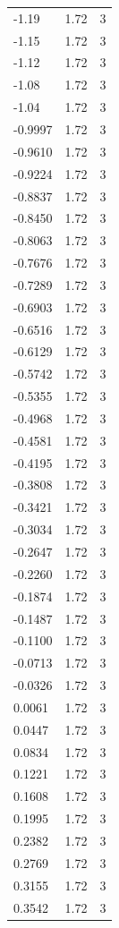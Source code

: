 \begin{longtable}{lrr}
  -1.19 & 1.72 & 3 \\
  -1.15 & 1.72 & 3 \\
  -1.12 & 1.72 & 3 \\
  -1.08 & 1.72 & 3 \\
  -1.04 & 1.72 & 3 \\
  -0.9997 & 1.72 & 3 \\
  -0.9610 & 1.72 & 3 \\
  -0.9224 & 1.72 & 3 \\
  -0.8837 & 1.72 & 3 \\
  -0.8450 & 1.72 & 3 \\
  -0.8063 & 1.72 & 3 \\
  -0.7676 & 1.72 & 3 \\
  -0.7289 & 1.72 & 3 \\
  -0.6903 & 1.72 & 3 \\
  -0.6516 & 1.72 & 3 \\
  -0.6129 & 1.72 & 3 \\
  -0.5742 & 1.72 & 3 \\
  -0.5355 & 1.72 & 3 \\
  -0.4968 & 1.72 & 3 \\
  -0.4581 & 1.72 & 3 \\
  -0.4195 & 1.72 & 3 \\
  -0.3808 & 1.72 & 3 \\
  -0.3421 & 1.72 & 3 \\
  -0.3034 & 1.72 & 3 \\
  -0.2647 & 1.72 & 3 \\
  -0.2260 & 1.72 & 3 \\
  -0.1874 & 1.72 & 3 \\
  -0.1487 & 1.72 & 3 \\
  -0.1100 & 1.72 & 3 \\
  -0.0713 & 1.72 & 3 \\
  -0.0326 & 1.72 & 3 \\
  0.0061 & 1.72 & 3 \\
  0.0447 & 1.72 & 3 \\
  0.0834 & 1.72 & 3 \\
  0.1221 & 1.72 & 3 \\
  0.1608 & 1.72 & 3 \\
  0.1995 & 1.72 & 3 \\
  0.2382 & 1.72 & 3 \\
  0.2769 & 1.72 & 3 \\
  0.3155 & 1.72 & 3 \\
  0.3542 & 1.72 & 3 \\

\end{longtable}
